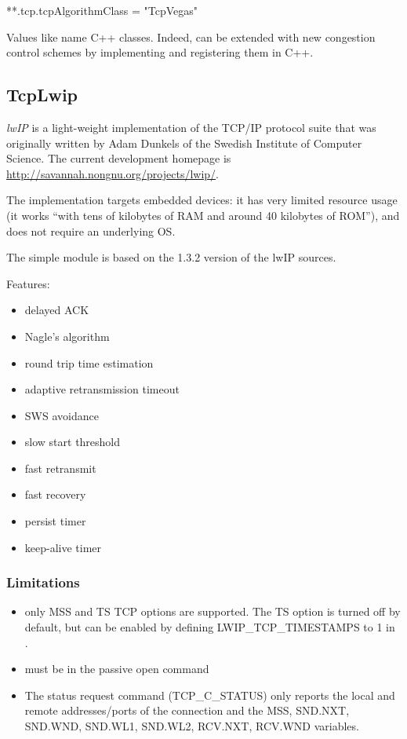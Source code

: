 \begin{inifile}
**.tcp.tcpAlgorithmClass = "TcpVegas"
\end{inifile}

Values like  name C++ classes. Indeed,  can be
extended with new congestion control schemes by implementing and registering
them in C++.



\subsection{TcpLwip}
\label{sec:transport:tcplwip}

\textit{lwIP} is a light-weight implementation of the TCP/IP protocol suite
that was originally written by Adam Dunkels of the Swedish Institute of
Computer Science. The current development homepage is
\url{http://savannah.nongnu.org/projects/lwip/}.

The implementation targets embedded devices: it has very limited resource usage
(it works ``with tens of kilobytes of RAM and around 40 kilobytes of ROM''), and
does not require an underlying OS.

The  simple module is based on the 1.3.2 version of
the lwIP sources.

Features:

\begin{itemize}
\item delayed ACK
\item Nagle's algorithm
\item round trip time estimation
\item adaptive retransmission timeout
\item SWS avoidance
\item slow start threshold
\item fast retransmit
\item fast recovery
\item persist timer
\item keep-alive timer
\end{itemize}

\subsubsection*{Limitations}

\begin{itemize}
  \item only MSS and TS TCP options are supported. The TS option is turned off
        by default, but can be enabled by defining LWIP\_TCP\_TIMESTAMPS to 1
        in .
  \item {} must be  in the passive open command
  \item The status request command (TCP\_C\_STATUS) only reports the
          local and remote addresses/ports of the connection and
          the MSS, SND.NXT, SND.WND, SND.WL1, SND.WL2, RCV.NXT, RCV.WND variables.
\end{itemize}

